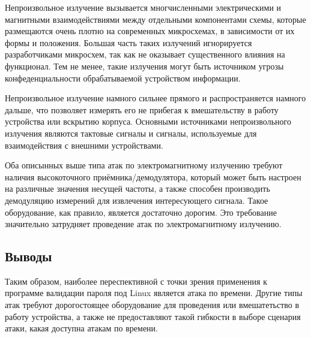 Непроизвольное излучение вызывается многчисленными электрическими и магнитными
взаимодействиями между отдельными компонентами схемы, которые размещаются очень
плотно на современных микросхемах, в зависимости от их формы и положения.
Большая часть таких излучений игнорируется разработчиками микросхем, так как не
оказывает существенного влияния на функционал. Тем не менее, такие излучения
могут быть источником угрозы конфеденциальности обрабатываемой устройством
информации.

Непроизвольное излучение намного сильнее прямого и распространяется намного
дальше, что позволяет измерять его не прибегая к вмешательству в работу
устройства или вскрытию корпуса. Основными источниками непроизвольного
излучения являются тактовые сигналы и сигналы, используемые для взаимодействия
с внешними устройствами.

Оба описынных выше типа атак по электромагнитному излучению требуют наличия
высокоточного приёмника/демодулятора, который может быть настроен на различные
значения несущей частоты, а также способен производить демодуляцию измерений
для извлечения интересующего сигнала. Такое оборудование, как правило, является
достаточно дорогим. Это требование значительно затрудняет проведение атак по
электромагнитному излучению.

\subsection{Выводы}

Таким образом, наиболее переспективной с точки зрения применения к программе
валидации пароля под Linux является атака по времени. Другие типы атак требуют
дорогостоящее оборудование для проведения или вмешатетьство в работу устройства,
а также не предоставляют такой гибкости в выборе сценария атаки, какая доступна
атакам по времени.

\clearpage
